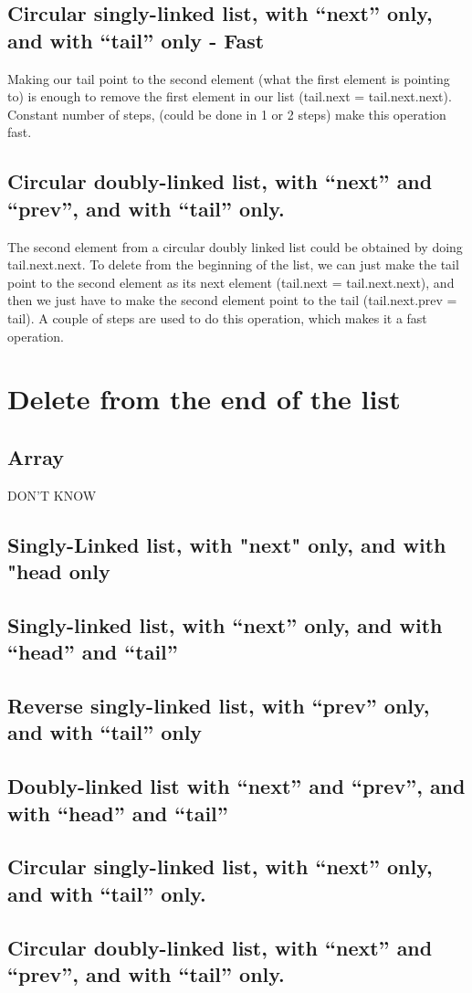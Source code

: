 \documentclass{article}
\begin{document}
\subsection{Circular singly-linked list, with “next” only, and with “tail” only - Fast}
Making our tail point to the second element (what the first element is pointing to) is enough to remove the first element in our list (tail.next = tail.next.next). Constant number of steps, (could be done in 1 or 2 steps) make this operation fast. 

\subsection{Circular doubly-linked list, with “next” and “prev”, and with “tail” only.}
The second element from a circular doubly linked list could be obtained by doing tail.next.next. To delete from the beginning of the list, we can just make the tail point to the second element as its next element (tail.next = tail.next.next), and then we just have to make the second element point to the tail (tail.next.prev = tail). A couple of steps are used to do this operation, which makes it a fast operation.




\section{Delete from the end of the list}
\subsection{Array}
DON'T KNOW

\subsection{Singly-Linked list, with "next" only, and with "head only}
\subsection{Singly-linked list, with “next” only, and with “head” and “tail”}

\subsection{Reverse singly-linked list, with “prev” only, and with “tail” only}

\subsection{Doubly-linked list with “next” and “prev”, and with “head” and “tail”}

\subsection{Circular singly-linked list, with “next” only, and with “tail” only.}

\subsection{Circular doubly-linked list, with “next” and “prev”, and with “tail” only.}
\end{document}
